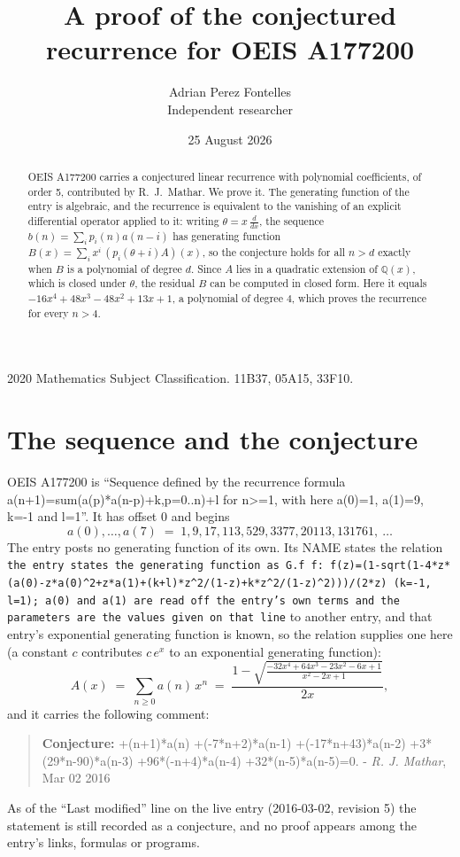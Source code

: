 \documentclass[11pt,a4paper]{article}
\title{A proof of the conjectured recurrence for OEIS A177200}
\author{Adrian Perez Fontelles\\ \small Independent researcher}
\date{25 August 2026}
\theoremstyle{plain}
\theoremstyle{definition}
\begin{document}
\maketitle

\begin{abstract}
OEIS A177200 carries a conjectured linear recurrence with polynomial coefficients, of
order 5, contributed by R.~J.~Mathar. We prove it. The generating function of the
entry is algebraic, and the recurrence is equivalent to the vanishing of an explicit
differential operator applied to it: writing $\theta=x\,\frac{d}{dx}$, the sequence
$b(n)=\sum_{i}p_{i}(n)a(n-i)$ has generating function
$B(x)=\sum_{i}x^{i}\,(p_{i}(\theta+i)A)(x)$, so the conjecture holds for all $n>d$ exactly
when $B$ is a polynomial of degree $d$. Since $A$ lies in a quadratic extension of
$\mathbb{Q}(x)$, which is closed under $\theta$, the residual $B$ can be computed in
closed form. Here it equals $- 16 x^{4} + 48 x^{3} - 48 x^{2} + 13 x + 1$, a polynomial of degree $4$, which proves
the recurrence for every $n>4$.
\end{abstract}

\noindent\small 2020 Mathematics Subject Classification. 11B37, 05A15, 33F10.\normalsize

\section{The sequence and the conjecture}

OEIS A177200 is ``Sequence defined by the recurrence formula a(n+1)=sum(a(p)*a(n-p)+k,p=0..n)+l for n>=1, with here a(0)=1, a(1)=9, k=-1 and l=1''. It has offset $0$ and begins
\[
a(0),\dots,a(7)\;=\;1, 9, 17, 113, 529, 3377, 20113, 131761,\ \dots
\]
The entry posts no generating function of its own. Its NAME states the
relation \texttt{the entry states the generating function as G.f f: f(z)=(1-sqrt(1-4*z*(a(0)-z*a(0)\textasciicircum{}2+z*a(1)+(k+l)*z\textasciicircum{}2/(1-z)+k*z\textasciicircum{}2/(1-z)\textasciicircum{}2)))/(2*z) (k=-1, l=1); a(0) and a(1) are read off the entry's own terms and the parameters are the values given on that line} to another entry, and that entry's exponential generating
function is known, so the relation supplies one here (a constant $c$ contributes
$c\,e^{x}$ to an exponential generating function):
\begin{equation}\label{eq:gf}
A(x)\;=\;\sum_{n\ge 0} a(n)\,x^{n}\;=\;\frac{1 - \sqrt{\frac{- 32 x^{4} + 64 x^{3} - 23 x^{2} - 6 x + 1}{x^{2} - 2 x + 1}}}{2 x} ,
\end{equation}
and it carries the following comment:
\begin{quote}\small
\textbf{Conjecture:} +(n+1)*a(n) +(-7*n+2)*a(n-1) +(-17*n+43)*a(n-2) +3*(29*n-90)*a(n-3) +96*(-n+4)*a(n-4) +32*(n-5)*a(n-5)=0. - \emph{R. J. Mathar}, Mar 02 2016
\end{quote}
As of the ``Last modified'' line on the live entry (2016-03-02, revision 5) the
statement is still recorded as a conjecture, and no proof appears among the entry's links,
formulas or programs.
\end{document}
